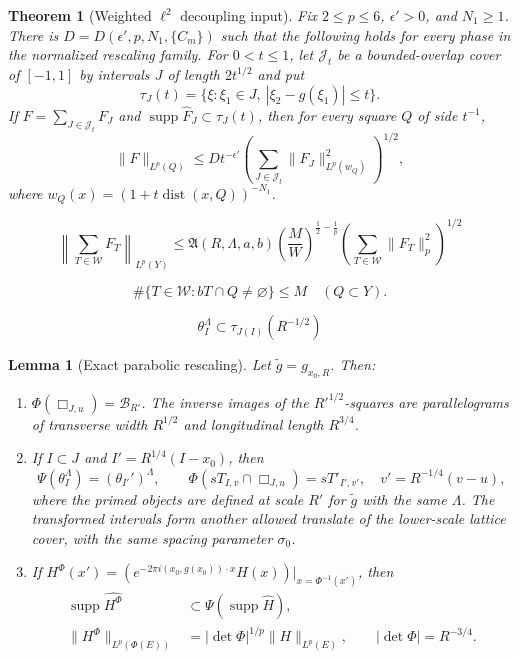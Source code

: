 \documentclass[10pt,a4paper]{amsart}
\newtheorem{theorem}{Theorem}
\newtheorem{lemma}{Lemma}
\newcommand{\dist}{\operatorname{dist}}
\newcommand{\supp}{\operatorname{supp}}
\begin{document}
\begin{theorem}[Weighted $\ell^2$ decoupling input]
\label{thm:appendix-l2}
Fix $2\le p\le6$, $\epsilon'>0$, and $N_1\ge1$.  There is
$D=D(\epsilon',p,N_1,\{C_m\})$ such that the following holds for every phase
in the normalized rescaling family.  For $0<t\le1$, let $\mathcal J_t$ be a
bounded-overlap cover of $[-1,1]$ by intervals $J$ of length $2t^{1/2}$ and
put
\[
 \tau_J(t)=\{\xi:\xi_1\in J,\ |\xi_2-g(\xi_1)|\le t\}.
\]
If $F=\sum_{J\in\mathcal J_t}F_J$ and
$\supp\widehat F_J\subset\tau_J(t)$, then for every square $Q$ of side
$t^{-1}$,
\begin{equation}\label{eq:appendix-l2}
 \|F\|_{L^p(Q)}
 \le D t^{-\epsilon'}
 \left(\sum_{J\in\mathcal J_t}
       \|F_J\|_{L^p(w_Q)}^2\right)^{1/2},
\end{equation}
where $w_Q(x)=(1+t\dist(x,Q))^{-N_1}$.
\end{theorem}

\begin{equation}\label{eq:appendix-Adef}
 \left\|\sum_{T\in\mathcal W}F_T\right\|_{L^p(Y)}
 \le \mathfrak A(R,\Lambda,a,b)
 \left(\frac{M}{W}\right)^{\frac12-\frac1p}
 \left(\sum_{T\in\mathcal W}\|F_T\|_p^2\right)^{1/2}
\end{equation}

\begin{equation}\label{eq:appendix-multiplicity}
 \#\{T\in\mathcal W:bT\cap Q\ne\varnothing\}\le M
 \quad(Q\subset Y).
\end{equation}

\begin{equation}\label{eq:cap-in-tau}
 \theta_I^\Lambda
 \subset\tau_{J(I)}(R^{-1/2})
\end{equation}

\begin{lemma}[Exact parabolic rescaling]
\label{lem:appendix-rescaling}
Let $\widetilde g=g_{x_0,R}$.  Then:
\begin{enumerate}[label=\textup{(\alph*)},leftmargin=2em]
\item $\Phi(\Box_{J,u})=\mathcal B_{R'}$.  The inverse images of the
$R'^{1/2}$-squares are parallelograms of transverse width $R^{1/2}$ and
longitudinal length $R^{3/4}$.
\item If $I\subset J$ and $I'=R^{1/4}(I-x_0)$, then
\[
 \Psi(\theta_I^\Lambda)=(\theta_{I'}')^\Lambda,
 \qquad
 \Phi(sT_{I,v}\cap\Box_{J,u})=sT'_{I',v'},
 \quad v'=R^{-1/4}(v-u),
\]
where the primed objects are defined at scale $R'$ for $\widetilde g$ with
the same $\Lambda$.  The transformed intervals form another allowed translate of the
lower-scale lattice cover, with the same spacing parameter $\sigma_0$.
\item If
$H^\Phi(x')=(e^{-2\pi i(x_0,g(x_0))\cdot x}H(x))|_{x=\Phi^{-1}(x')}$,
then
\begin{align*}
 \supp\widehat{H^\Phi}&\subset\Psi(\supp\widehat H),\\
 \|H^\Phi\|_{L^p(\Phi(E))}
 &=|\det\Phi|^{1/p}\|H\|_{L^p(E)},
 \qquad |\det\Phi|=R^{-3/4}.
\end{align*}
\end{enumerate}
\end{lemma}
\end{document}
